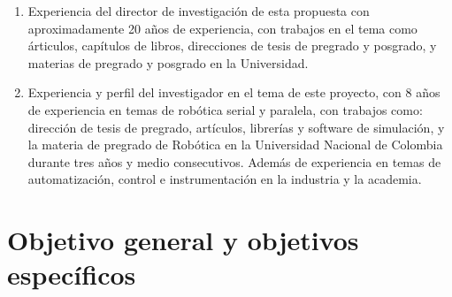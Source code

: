\documentclass[12pt,twoside,onecolumn,letterpaper]{article}
\begin{document}
\begin{itemize}
\begin{enumerate}[1)]
  \item Experiencia del director de investigaci\'on de esta propuesta con aproximadamente 20 a\~nos de experiencia, con trabajos en el tema como \'articulos\cite{Heredia2007}, cap\'itulos de libros\cite{M2005,M2005a}, direcciones de tesis de pregrado y posgrado, y materias de pregrado y posgrado en la Universidad.
  \item Experiencia y perfil del investigador en el tema de este proyecto, con 8 a\~nos de experiencia en temas de rob\'otica serial y paralela, con trabajos como: direcci\'on de tesis de pregrado\cite{Cortes2009,Valencia2009,Barragan2009,Silva2009}, art\'iculos\cite{Castillo2007}, librer\'ias\cite{Castillo2008} y software de simulaci\'on\cite{Castillo2010}, y la materia de pregrado de Rob\'otica en la Universidad Nacional de Colombia durante tres a\~nos y medio consecutivos. Adem\'as de experiencia en temas de automatizaci\'on, control e instrumentaci\'on en la industria y la academia.
  \end{enumerate}
\end{itemize}

\section{Objetivo general y objetivos espec\'ificos}
\label{sec:objs}
\end{document}
